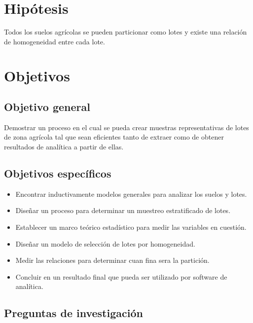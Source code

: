 \documentclass{report}
\begin{document}
\section{Hipótesis}

Todos los suelos agrícolas se pueden particionar como lotes y existe una relación de homogeneidad entre cada lote.

\section{Objetivos}


\subsection{Objetivo general}

Demostrar un proceso en el cual se pueda crear muestras representativas de lotes de zona agrícola tal que sean eficientes tanto de extraer como de obtener resultados de analítica a partir de ellas.

\subsection{Objetivos específicos}

\begin{itemize}
    \item Encontrar inductivamente modelos generales para analizar los suelos y lotes. 
    \item Diseñar un proceso para determinar un muestreo estratificado de lotes.
    \item Establecer un marco teórico estadístico para medir las variables en cuestión.
    \item Diseñar un modelo de selección de lotes por homogeneidad.
    \item Medir las relaciones para determinar cuan fina sera la partición.
    \item Concluir en un resultado final que pueda ser utilizado por software de analítica.
\end{itemize}


\subsection{Preguntas de investigación}
\end{document}
